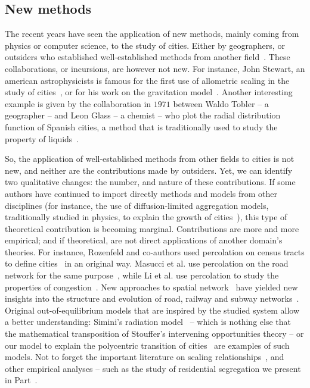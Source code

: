 \subsection{New methods}
\label{sub:new_methods}

The recent years have seen the application of new methods, mainly coming from
physics or computer science, to the study of cities. Either by geographers, or
outsiders who established well-established methods from another
field~\cite{Batty:1995}. These collaborations, or incursions, are however not
new. For instance, John Stewart, an american astrophysicists is famous for the first use of allometric
scaling in the study of cities~\cite{Stewart:1947}, or for his work 
on the gravitation model~\cite{Stewart:1948}. Another interesting example is
given by the collaboration in $1971$ between Waldo Tobler -- a geographer -- and
Leon Glass -- a chemist -- who plot the radial distribution function of Spanish
cities, a method that is traditionally used to study the property of
liquids~\cite{Glass:1971}.

So, the application of well-established methods from other fields to cities is
not new, and neither are the contributions made by outsiders. Yet, we can
identify two qualitative changes: the number, and nature of these contributions.
If some authors have continued to import directly methods and models from other
disciplines (for instance, the use of diffusion-limited aggregation models,
traditionally studied in physics, to explain the growth of
cities~\cite{Makse:1995}), this type of theoretical contribution is becoming
marginal. Contributions are more and more empirical; and if theoretical, are not
direct applications of another domain's theories. For
instance, Rozenfeld and co-authors used percolation on census tracts to define
cities~\cite{Rozenfeld:2008} in an original way. Masucci et al. use percolation
on the road network for the same purpose~\cite{Masucci:2015}, while Li et al.
use percolation to study the properties of congestion~\cite{Li:2015}. New
approaches to spatial network~\cite{Barthelemy:2011} have yielded new insights
into the structure and evolution of road, railway and subway networks~\cite{Strano:2012,
Barthelemy:2013,Louf:2013_emergence,Louf:2014_scaling,Louf:2014}.
Original out-of-equilibrium models that are inspired by the studied system allow
a better understanding: Simini's radiation model~\cite{Simini:2012,Simini:2013}
 -- which is nothing else that the mathematical transposition of Stouffer's
 intervening opportunities theory -- or our model to explain the polycentric
 transition of cities~\cite{Louf:2013_polycentric} are examples of such models.
 Not to forget the important literature on scaling
 relationships~\cite{Bettencourt:2007, Bettencourt:2013, Louf:2014_mobility,
 Arcaute:2014, Louf:2014_smog}, and other empirical analyses -- such as the
 study of residential segregation we present in Part~\cite{part:segregation}.

